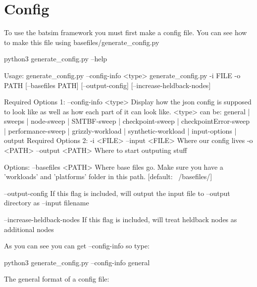 \documentclass[titlepage]{article}
\let\oldsection\section
\renewcommand\section{\clearpage\oldsection}
\newenvironment{regular}{\color{black}}{}
\begin{document}
\section{Config}
\begin{regular}

To use the batsim framework you must first make a config file.
You can see how to make this file using basefiles/generate\_config.py

\begin{terminal}
python3 generate_config.py --help
\end{terminal}

\begin{terminal}
Usage:
    generate_config.py --config-info <type>
    generate_config.py -i FILE -o PATH [--basefiles PATH] [--output-config] [--increase-heldback-nodes]

Required Options 1:
    --config-info <type>                Display how the json config is supposed to look like
                                        as well as how each part of it can look like.
                                        <type> can be:
                                                general | sweeps |
                                                node-sweep | SMTBF-sweep | checkpoint-sweep | checkpointError-sweep | performance-sweep |
                                                grizzly-workload | synthetic-workload |
                                                input-options | output
Required Options 2:
    -i <FILE> --input <FILE>            Where our config lives
    -o <PATH> --output <PATH>           Where to start outputing stuff
                                        
Options:
    --basefiles <PATH>                  Where base files go.  Make sure you have a 'workloads' and 'platforms' folder
                                        in this path.
                                        [default: ~/basefiles/]

    --output-config                     If this flag is included, will output the input file to --output directory
                                        as --input filename

    --increase-heldback-nodes           If this flag is included, will treat heldback nodes as additional nodes

\end{terminal}

As you can see you can get --config-info  so type:
\begin{terminal}
python3 generate_config.py --config-info general
\end{terminal}
\begin{terminal}
 The general format of a config file:
    

\end{terminal}
\end{regular}
\end{document}
